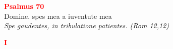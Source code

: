 


\def\greinitialformat#1{%
{\fontsize{39}{39}\selectfont #1}%
}




\vspace{0.3cm}
\begin{center}
 \textcolor{red}{\large \bf Psalmus 70}\\
Domine, spes mea a iuventute mea\\
\textit{\small Spe gaudentes, in tribulatione patientes. (Rom 12,12)}
\end{center}
\begin{center}
\textcolor{red}{\bf I}
\end{center}

